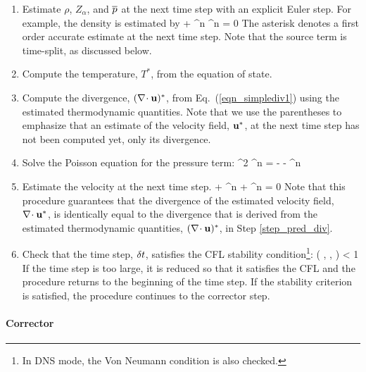 \begin{enumerate}
\item Estimate $\rho$, $Z_\alpha$, and $\overline{p}$ at the next time step with an explicit Euler step. For
example, the density is estimated by
\be {} + \nabla\!\cdot \rho^n \bu^n = 0 \ee
The asterisk denotes a first order accurate estimate at the next time step.  Note that the source term is time-split, as discussed below.

\item Compute the temperature, $T^*$, from the equation of state.

\item \label{step_pred_div} Compute the divergence, $(\nabla\!\cdot {\mathbf{u}})^*$, from Eq.~(\ref{eqn_simplediv1}) using the estimated thermodynamic quantities. Note that we use the parentheses to emphasize that an estimate of the velocity field, ${\mathbf{u}}^*$, at the next time step has not been computed yet, only its divergence.

\item Solve the Poisson equation for the pressure term:
\be \nabla^2 \cH^n = -  - \nabla\!\cdot \bF^n \ee

\item Estimate the velocity at the next time step.
\be
{} +  \bF^n + \nabla \calH^n = 0
\ee
Note that this procedure guarantees that the divergence of the estimated velocity field, $\nabla\!\cdot {\mathbf{u}}^*$, is identically
equal to the divergence that is derived from the estimated thermodynamic quantities, $(\nabla\!\cdot {\mathbf{u}})^*$, in Step \ref{step_pred_div}.

\item Check that the time step, $\delta t$, satisfies the CFL stability condition\footnote{In DNS mode, the Von Neumann condition is also checked.}:
\be \dt \; \max\left( , ,  \right) < 1 \quad \ee
If the time step is too large, it is reduced so that it satisfies
the CFL and the procedure returns to the beginning of the time step.
If the stability criterion is satisfied, the procedure continues to the corrector step.
\end{enumerate}

\paragraph{Corrector}

